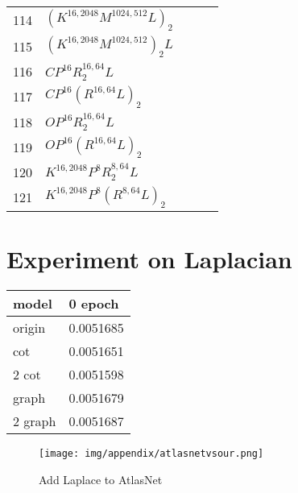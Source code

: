 \begin{appendices}
\begin{table*}
\begin{tabular}{| l | l | l | l}
		114&$(K^{16,2048}M^{1024,512}L)_2$ &~&~\\
		115&$(K^{16,2048}M^{1024,512})_2L$ &~&~\\
		116&$CP^{16}R^{16,64}_2L$ &~&~\\
		117&$CP^{16}(R^{16,64}L)_2$ &~&~\\
		118&$OP^{16}R^{16,64}_2L$ &~&~\\
		119&$OP^{16}(R^{16,64}L)_2$ &~&~\\
		120&$K^{16,2048}P^{8}R^{8,64}_2L$ &~&~\\
		121&$K^{16,2048}P^{8}(R^{8,64}L)_2$ &~&~\\
	\end{tabular}
\end{table*}
\newpage
\section{Experiment on Laplacian}
\begin{table*}
\label{tab:lpl}
\centering
\begin{tabular}{| l | l |}
model  &   0 epoch   \\
\hline
origin &   0.0051685 \\
cot    &   0.0051651 \\
2 cot   &  0.0051598 \\
graph   &  0.0051679 \\
2 graph &  0.0051687 \\
\end{tabular}
\end{table*}
\begin{figure}[htbp]
	\centering
	\texttt{[image: img/appendix/atlasnetvsour.png]}
	\caption{Add Laplace to AtlasNet}
	\label{fig:atlasnet_lpl}
\end{figure}
\newpage

\end{appendices}
